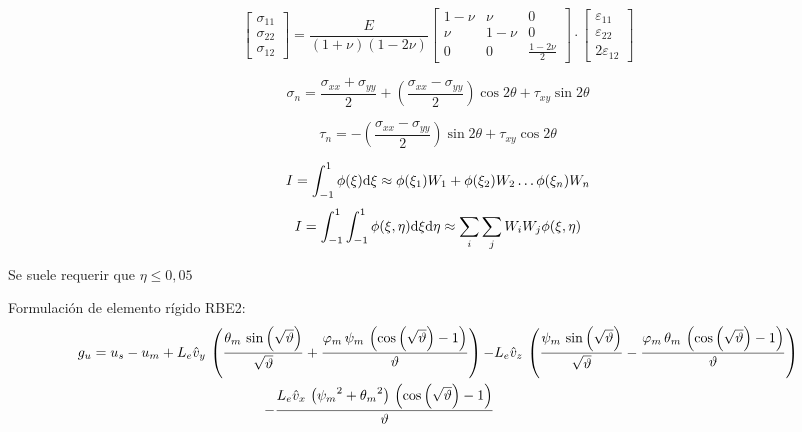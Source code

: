 \begin{equation}
\begin{bmatrix}
\sigma_{11} \\
\sigma_{22} \\
\sigma_{12}
\end{bmatrix}
={\frac{E}{(1+\nu)(1-2\nu)}} 
\begin{bmatrix}
1-\nu & \nu &0 \\
\nu &1-\nu& 0 \\
0 & 0 & \frac{1-2\nu}{2}
\end{bmatrix}
\cdot
\begin{bmatrix}
\varepsilon_{11} \\
\varepsilon_{22} \\
2\varepsilon_{12}
\end{bmatrix}
\end{equation}

\begin{equation}
\sigma_{n}=\frac{\sigma_{xx}+\sigma_{yy}}{2}+\left(\frac{\sigma_{xx}-\sigma_{yy}}{2}\right)\cos 2\theta +\tau_{xy}\sin 2\theta 
\end{equation}

\begin{equation}
\tau_{n}=-\left(\frac{\sigma_{xx}-\sigma_{yy}}{2}\right)\sin 2\theta +\tau_{xy}\cos 2\theta 
\end{equation}

\begin{equation}
I=\int^1_{-1} \phi(\xi) \textrm{d} \xi \approx \phi(\xi_1) W_1+\phi(\xi_2) W_2 \ldots \phi(\xi_n) W_n
\end{equation}
\begin{equation}
I=\int^1_{-1} \int^1_{-1}\phi(\xi,\eta) \textrm{d} \xi \textrm{d} \eta\approx \sum_i \sum_j W_i W_j\phi(\xi,\eta) 
\end{equation}

Se suele requerir que $\eta\leq 0,05$


Formulación de elemento rígido RBE2:
\newcommand{\squareangles}{\vartheta}
\begin{align*}
g_u = u_{s}-u_{m}+L_{e}\versor{v}_{y}\,\left(\frac{\theta_{m}\,\sin\left(\sqrt{\squareangles}\right)}{\sqrt{\squareangles}}+\frac{\varphi_{m}\,\psi_{m}\,\left(\cos\left(\sqrt{\squareangles}\right)-1\right)}{\squareangles}\right)-&L_{e}\versor{v}_{z}\,\left(\frac{\psi_{m}\,\sin\left(\sqrt{\squareangles}\right)}{\sqrt{\squareangles}}-\frac{\varphi_{m}\,\theta_{m}\,\left(\cos\left(\sqrt{\squareangles}\right)-1\right)}{\squareangles}\right)\\
 - \frac{L_{e}\versor{v}_{x}\,\left({\psi_{m}}^2+{\theta_{m}}^2\right)\,\left(\cos\left(\sqrt{\squareangles}\right)-1\right)}{\squareangles}
\end{align*}

